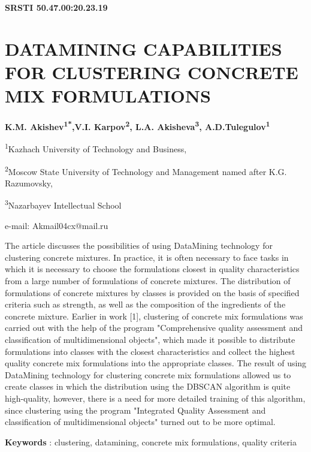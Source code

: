 \clearpage
{\bfseries SRSTI 50.47.00:20.23.19}

\section{DATAMINING CAPABILITIES FOR CLUSTERING CONCRETE MIX
FORMULATIONS}

\begin{center}
{\bfseries K.M. Akishev\textsuperscript{1*},V.I. Karpov\textsuperscript{2},
L.A. Akisheva\textsuperscript{3}, A.D.Tulegulov\textsuperscript{1}}

\textsuperscript{1}Kazhach University of Technology and
Business,

\textsuperscript{2}Moscow State University of Technology and
Management named after K.G. Razumovsky,

\textsuperscript{3}Nazarbayev
Intellectual School

e-mail: Akmail04cx@mail.ru
\end{center}

The article discusses the possibilities of using DataMining technology
for clustering concrete mixtures. In practice, it is often necessary to
face tasks in which it is necessary to choose the formulations closest
in quality characteristics from a large number of formulations of
concrete mixtures. The distribution of formulations of concrete mixtures
by classes is provided on the basis of specified criteria such as
strength, as well as the composition of the ingredients of the concrete
mixture. Earlier in work {[}1{]}, clustering of concrete mix
formulations was carried out with the help of the program "Comprehensive
quality assessment and classification of multidimensional objects",
which made it possible to distribute formulations into classes with the
closest characteristics and collect the highest quality concrete mix
formulations into the appropriate classes. The result of using
DataMining technology for clustering concrete mix formulations allowed
us to create classes in which the distribution using the DBSCAN
algorithm is quite high-quality, however, there is a need for more
detailed training of this algorithm, since clustering using the program
"Integrated Quality Assessment and classification of multidimensional
objects" turned out to be more optimal.

{\bfseries Keywords} : clustering, datamining, concrete mix formulations,
quality criteria

